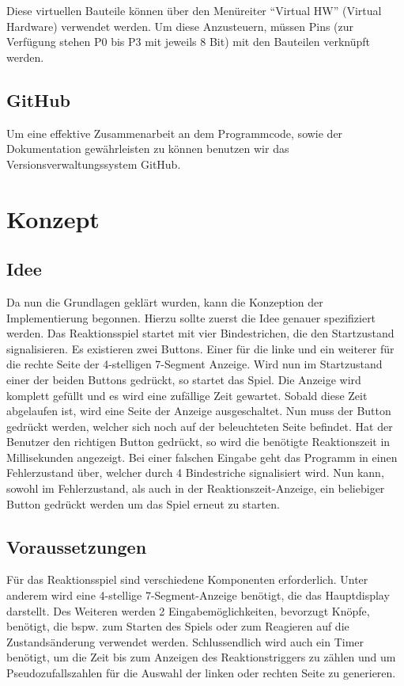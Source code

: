 \documentclass[11pt,ngerman]{report}
\begin{document}
Diese virtuellen Bauteile können über den Menüreiter “Virtual HW” (Virtual Hardware) verwendet werden. Um diese Anzusteuern, müssen Pins (zur Verfügung stehen P0 bis P3 mit jeweils 8 Bit) mit den Bauteilen verknüpft werden.

\section{GitHub}

Um eine effektive Zusammenarbeit an dem Programmcode, sowie der Dokumentation gewährleisten zu können benutzen wir das Versionsverwaltungssystem GitHub.


\chapter{Konzept}

\section{Idee}
Da nun die Grundlagen geklärt wurden, kann die Konzeption der Implementierung begonnen. Hierzu sollte zuerst die Idee genauer spezifiziert werden.
Das Reaktionsspiel startet mit vier Bindestrichen, die den Startzustand signalisieren. Es existieren zwei Buttons. Einer für die linke und ein weiterer für die rechte Seite der 4-stelligen 7-Segment Anzeige. Wird nun im Startzustand einer der beiden Buttons gedrückt, so startet das Spiel. Die Anzeige wird komplett gefüllt und es wird eine zufällige Zeit gewartet. Sobald diese Zeit abgelaufen ist, wird eine Seite der Anzeige ausgeschaltet. Nun muss der Button gedrückt werden, welcher sich noch auf der beleuchteten Seite befindet. Hat der Benutzer den richtigen Button gedrückt, so wird die benötigte Reaktionszeit in Millisekunden angezeigt. Bei einer falschen Eingabe geht das Programm in einen Fehlerzustand über, welcher durch 4 Bindestriche signalisiert wird. Nun kann, sowohl im Fehlerzustand, als auch in der Reaktionszeit-Anzeige, ein beliebiger Button gedrückt werden um das Spiel erneut zu starten.

\section{Voraussetzungen}
Für das Reaktionsspiel sind verschiedene Komponenten erforderlich. Unter anderem wird eine 4-stellige 7-Segment-Anzeige benötigt, die das Hauptdisplay darstellt. Des Weiteren werden 2 Eingabemöglichkeiten, bevorzugt Knöpfe, benötigt, die bspw. zum Starten des Spiels oder zum Reagieren auf die Zustandsänderung verwendet werden. Schlussendlich wird auch ein Timer benötigt, um die Zeit bis zum Anzeigen des Reaktionstriggers zu zählen und um Pseudozufallszahlen für die Auswahl der linken oder rechten Seite zu generieren.
\end{document}
